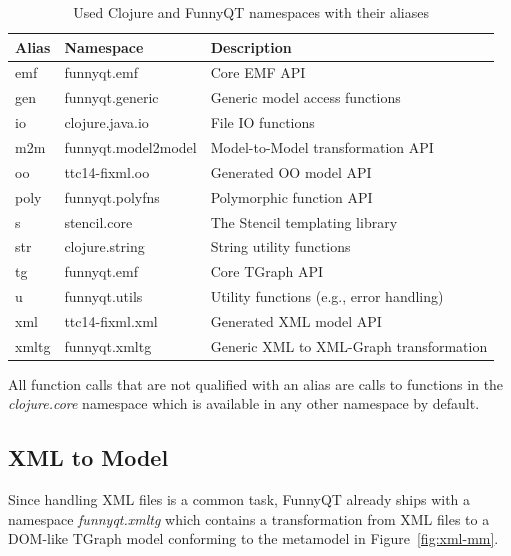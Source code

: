 \documentclass[a4paper]{article}
\begin{document}
\begin{table}[h!t]
  \centering
  \begin{tabular}{| l | l | l |}
    \hline
    \textbf{Alias} & \textbf{Namespace}           & \textbf{Description}\\
    \hline
    \textsf{emf}   & \textsf{funnyqt.emf}         & Core EMF API\\
    \textsf{gen}   & \textsf{funnyqt.generic}     & Generic model access functions\\
    \textsf{io}    & \textsf{clojure.java.io}     & File IO functions\\
    \textsf{m2m}   & \textsf{funnyqt.model2model} & Model-to-Model transformation API\\
    \textsf{oo}    & \textsf{ttc14-fixml.oo}      & Generated OO model API\\
    \textsf{poly}  & \textsf{funnyqt.polyfns}     & Polymorphic function API\\
    \textsf{s}     & \textsf{stencil.core}        & The Stencil templating library\\
    \textsf{str}   & \textsf{clojure.string}      & String utility functions\\
    \textsf{tg}    & \textsf{funnyqt.emf}         & Core TGraph API\\
    \textsf{u}     & \textsf{funnyqt.utils}       & Utility functions (e.g., error handling)\\
    \textsf{xml}   & \textsf{ttc14-fixml.xml}     & Generated XML model API\\
    \textsf{xmltg} & \textsf{funnyqt.xmltg}       & Generic XML to XML-Graph transformation\\
    \hline
  \end{tabular}
  \caption{Used Clojure and FunnyQT namespaces with their aliases}
  \label{tab:namespaces}
\end{table}

All function calls that are not qualified with an alias are calls to functions
in the \emph{clojure.core} namespace which is available in any other namespace
by default.

\subsection{XML to Model}
\label{sec:xml2model}

Since handling XML files is a common task, FunnyQT already ships with a
namespace \emph{funnyqt.xmltg} which contains a transformation from XML files
to a DOM-like TGraph model conforming to the metamodel in
Figure~\ref{fig:xml-mm}.
\end{document}

